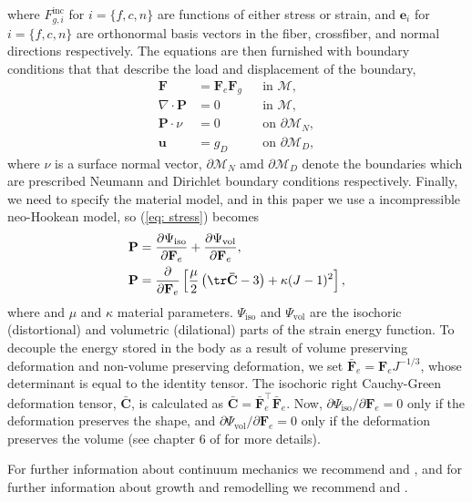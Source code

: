 where $F^\mathrm{inc}_{g, i}$ for  $i = \{f, c, n\}$ are functions of either stress or strain, and $\mathbf{e}_i$ for $i = {\{f, c, n\}}$ are orthonormal basis vectors in the fiber, crossfiber, and normal directions respectively. The equations are then furnished with boundary conditions that that describe the load and displacement of the boundary,
\begin{equation} \label{eq: system of equations}
\begin{aligned}
    \mathbf{F} & = \mathbf{F}_e\mathbf{F}_g && \text{in } \mathcal{M} ,\\
    \nabla\cdot\mathbf{P} & = 0 && \text{in } \mathcal{M}, \\
    \mathbf{P}\cdot \nu & = 0 && \text{on } \partial\mathcal{M}_N, \\
    \mathbf{u} & = g_D && \text{on } \partial\mathcal{M}_D,
\end{aligned}
\end{equation} 
where $\nu$ is a surface normal vector, $\partial\mathcal{M}_N$ amd $\partial\mathcal{M}_D$ denote the boundaries which are prescribed Neumann and Dirichlet boundary conditions respectively. Finally, we need to specify the material model, and in this paper we use a  incompressible neo-Hookean model, so (\ref{eq: stress}) becomes
\begin{align*}
    \mathbf{P} &= \frac{\partial\Psi_\text{iso}}{\partial \mathbf{F}_e} + \frac{\partial\Psi_\text{vol}}{\partial \mathbf{F}_e}, \\
    \mathbf{P} &= \frac{\partial}{\partial \mathbf{F}_e}\left[\frac{\mu}{2}\left(\tr\mathbf{\bar{C}} - 3\right) + \kappa(J-1)^2\right],
\end{align*}
where and $\mu$ and $\kappa$ material parameters. $\Psi_\text{iso}$ and $\Psi_\text{vol}$ are the isochoric (distortional) and volumetric (dilational) parts of the strain energy function. To decouple the energy stored in the body as a result of volume preserving deformation and non-volume preserving deformation, we set $\mathbf{\bar{F}}_e = \mathbf{F}_eJ^{-1/3}$, whose determinant is equal to the identity tensor. The isochoric right Cauchy-Green deformation tensor, $\mathbf{\bar{C}}$, is calculated as $\mathbf{\bar{C}} = \mathbf{\bar{F}}_e^\top \mathbf{\bar{F}}_e$. Now, $\partial\Psi_\text{iso}/\partial \mathbf{F}_e = 0$ only if the deformation preserves the shape, and $\partial\Psi_\text{vol}/\partial \mathbf{F}_e = 0$ only if the deformation preserves the volume (see chapter 6 of \citep{Holzapfel2002} for more details). \par 
For further information about continuum mechanics we recommend \citep{Marsden1983} and \citep{Holzapfel2002}, and for further information about growth and remodelling we recommend \citep{Goriely2017} and \citep{Yavari2010}.

